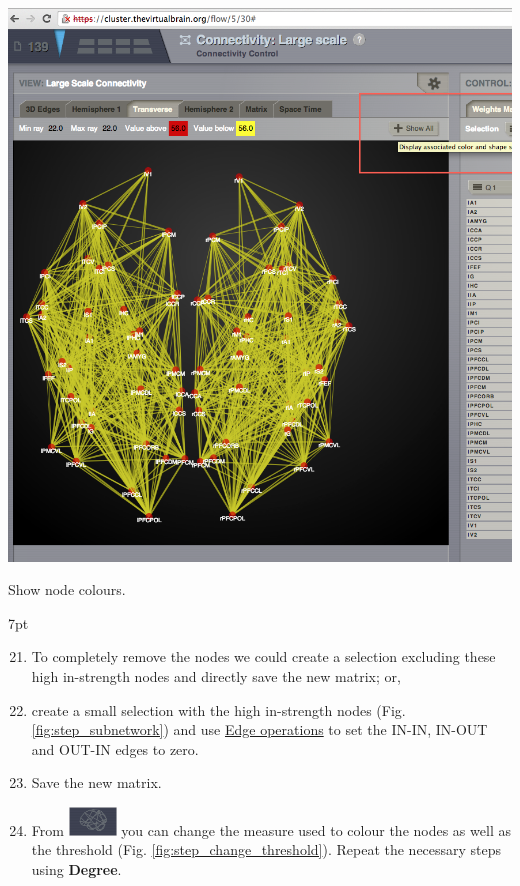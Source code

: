 \documentclass{tufte-handout}
\newenvironment{formal}{%
  \def\FrameCommand{%
    \hspace{1pt}%
    {\color{DarkBlue}\vrule width 2pt}%
    {\color{formalshade}\vrule width 4pt}%
    \colorbox{formalshade}%
  }%
  \MakeFramed{\advance\hsize-\width\FrameRestore}%
  \noindent\hspace{-4.55pt}%
  \begin{adjustwidth}{}{7pt}%
  \vspace{2pt}\vspace{2pt}%
}
{%
  \vspace{2pt}\end{adjustwidth}\endMakeFramed%
}
\begin{document}
\begin{marginfigure}
  \includegraphics[width=0.9\linewidth]{Handout_UI_ModellingStructuralLesions_ShowColourNodes}%
  \caption{Show node colours.}%
  \label{fig:step_12}%
\end{marginfigure}

\begin{formal}
  \begin{enumerate}[resume] %
  \setcounter{enumi}{20}
\item To completely remove the nodes we could create a selection excluding these
high in-strength nodes and directly save the new matrix; or,
\item create a small selection with the high in-strength nodes (Fig. \ref{fig:step_subnetwork}) and use \underline{Edge operations} to  set the IN-IN, IN-OUT and OUT-IN edges to zero. 
\item Save the new matrix.
\item From \includegraphics[width=0.1\textwidth]{butt_brain_menu} 
 you can change the measure used to colour the nodes as well as the threshold  (Fig. \ref{fig:step_change_threshold}). Repeat the necessary steps using \textbf{Degree}. 

  \end{enumerate}
\end{formal}
\end{document}
